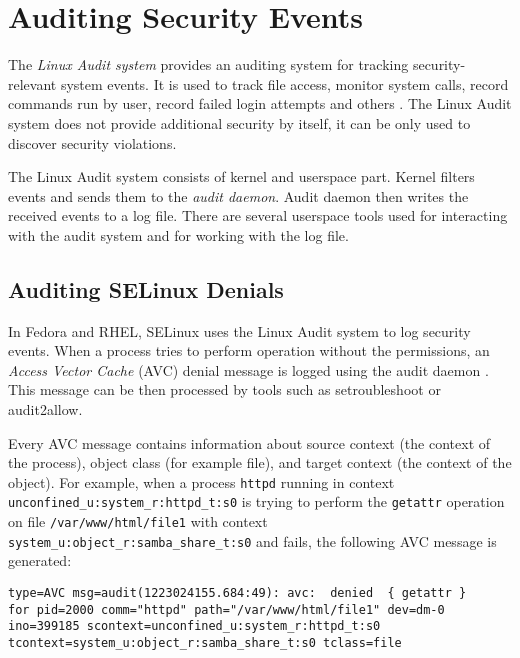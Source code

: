 \section{Auditing Security Events}

The \emph{Linux Audit system} provides an auditing system for tracking
security-relevant system events. It is used to track file access, monitor system
calls, record commands run by user, record failed login attempts and others
\cite{secguide}. The Linux Audit system does not provide additional security by
itself, it can be only used to discover security violations.

The Linux Audit system consists of kernel and userspace part. Kernel filters
events and sends them to the \emph{audit daemon}. Audit daemon then writes the
received events to a log file. There are several userspace tools used for
interacting with the audit system and for working with the log file.

\subsection{Auditing SELinux Denials}

In Fedora and RHEL, SELinux uses the Linux Audit system to log security events.
When a process tries to perform operation without the permissions, an
\emph{Access Vector Cache} (AVC) denial message is logged using the audit daemon
\cite{selinuxguide}. This message can be then processed by tools such as
setroubleshoot or audit2allow.

Every AVC message contains information about source context (the context of the
process), object class (for example file), and target context (the context of
the object). For example, when a process \texttt{httpd} running in context
\texttt{unconfined\_u:system\_r:httpd\_t:s0} is trying to perform the
\texttt{getattr} operation on file \texttt{/var/www/html/file1} with context
\texttt{system\_u:object\_r:samba\_share\_t:s0} and fails, the following AVC
message is generated:

\begin{lstlisting}
type=AVC msg=audit(1223024155.684:49): avc:  denied  { getattr }
for pid=2000 comm="httpd" path="/var/www/html/file1" dev=dm-0
ino=399185 scontext=unconfined_u:system_r:httpd_t:s0
tcontext=system_u:object_r:samba_share_t:s0 tclass=file
\end{lstlisting}


